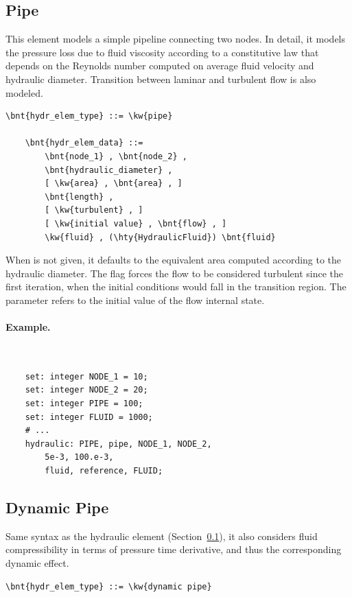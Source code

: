 \subsection{Pipe}
\label{sec:EL:HYDR:PIPE}
This element models a simple pipeline connecting two  nodes.
In detail, it models the pressure loss due to fluid viscosity
according to a constitutive law that depends on the Reynolds number
computed on average fluid velocity and hydraulic diameter.
Transition between laminar and turbulent flow is also modeled.
\begin{Verbatim}[commandchars=\\\{\}]
    \bnt{hydr_elem_type} ::= \kw{pipe}

    \bnt{hydr_elem_data} ::=
        \bnt{node_1} , \bnt{node_2} ,
        \bnt{hydraulic_diameter} ,
        [ \kw{area} , \bnt{area} , ]
        \bnt{length} ,
        [ \kw{turbulent} , ]
        [ \kw{initial value} , \bnt{flow} , ]
        \kw{fluid} , (\hty{HydraulicFluid}) \bnt{fluid}
\end{Verbatim}
When  is not given, it defaults to the equivalent area
computed according to the hydraulic diameter.
The flag  forces the flow to be considered turbulent
since the first iteration, when the initial conditions would fall
in the transition region.
The  parameter refers to the initial value
of the flow internal state.

\paragraph{Example.} \
\begin{verbatim}
    set: integer NODE_1 = 10;
    set: integer NODE_2 = 20;
    set: integer PIPE = 100;
    set: integer FLUID = 1000;
    # ...
    hydraulic: PIPE, pipe, NODE_1, NODE_2,
        5e-3, 100.e-3,
        fluid, reference, FLUID;
\end{verbatim}



\subsection{Dynamic Pipe}
\label{sec:EL:HYDR:DYNAMIC_PIPE}
Same syntax as the  hydraulic element
(Section~\ref{sec:EL:HYDR:PIPE}),
it also considers fluid compressibility in terms of pressure time derivative,
and thus the corresponding dynamic effect.
\begin{Verbatim}[commandchars=\\\{\}]
    \bnt{hydr_elem_type} ::= \kw{dynamic pipe}
\end{Verbatim}

